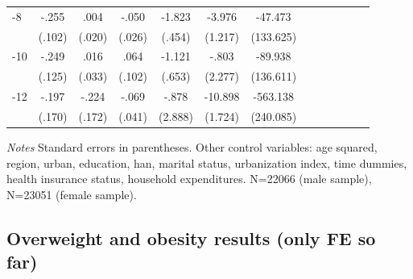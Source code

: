 \begin{table}[h]
\begin{adjustbox}{max width=\linewidth}
\begin{threeparttable}
{\begin{tabular}{l*{6}{SS}}
-8             &    -.255\sym{*}  &     .004         &    -.050         &   -1.823\sym{***}&   -3.976\sym{**} &  -47.473         \\
                &   (.102)         &   (.020)         &   (.026)         &   (.454)         &  (1.217)         &(133.625)         \\
-10            &    -.249\sym{*}  &     .016         &     .064         &   -1.121         &    -.803         &  -89.938         \\
                &   (.125)         &   (.033)         &   (.102)         &   (.653)         &  (2.277)         &(136.611)         \\
-12           &    -.197         &    -.224         &    -.069         &    -.878         &  -10.898\sym{***}& -563.138\sym{*}  \\
                &   (.170)         &   (.172)         &   (.041)         &  (2.888)         &  (1.724)         &(240.085)         \\      
\bottomrule
\end{tabular}
\begin{tablenotes}
\item \textit{Notes}   Standard errors in parentheses.
Other control variables: age squared, region, urban, education, han, marital status, urbanization index, time dummies, health insurance status, household expenditures. N=22066 (male sample), N=23051 (female sample).
\end{tablenotes}
}
\end{threeparttable}
\end{adjustbox}
\end{table}

\FloatBarrier





\subsection*{Overweight and obesity results (only FE so far)}

